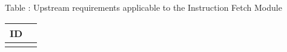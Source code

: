 {
  \vspace{0.5em}
  \begin{center}
    Table \thetable: Upstream requirements applicable to the Instruction Fetch Module\label{tab:ifm-upstream-requirements}
  \end{center}
  
\footnotesize
\begin{xltabular}{0.9\textwidth}{|X|c|}
  \hline
  \textbf{ID} \\
  \hline
   \\
  \hline
\end{xltabular}
}

